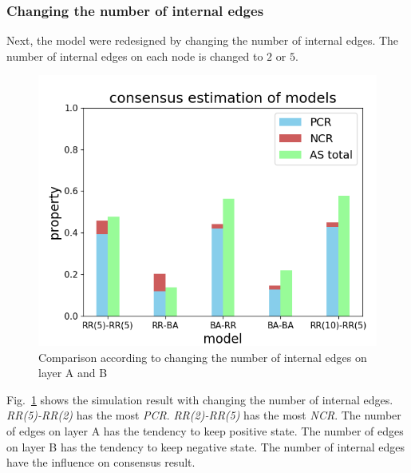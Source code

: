 \documentclass[english]{cccconf}
\begin{document}
\subsubsection{Changing the number of internal edges}
Next, the model were redesigned by changing the number of internal edges. The number of internal edges on each node is changed to $2$ or $5$.
\begin{figure}[!htb]
  \centering
  \includegraphics[width=\hsize]{FIG7.png}
  \caption{Comparison according to changing the number of internal edges on layer A and B}
  \label{Fig7}
\end{figure}
Fig.~\ref{Fig7} shows the simulation result with changing the number of internal edges. \textit{RR(5)-RR(2)} has the most \textit{PCR}. \textit{RR(2)-RR(5)} has the most \textit{NCR}. The number of edges on layer A has the tendency to keep positive state. The number of edges on layer B has the tendency to keep negative state. The number of internal edges have the influence on consensus result.
\end{document}
